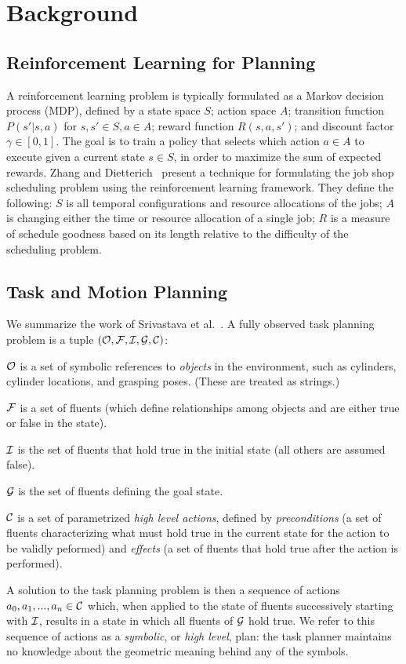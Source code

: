\section{Background}
\subsection{Reinforcement Learning for Planning}
A reinforcement learning problem is typically formulated as
a Markov decision process (MDP), defined by a state space
$S$; action space $A$; transition function $P(s' | s, a)$ for $s, s' \in S, a \in A$;
reward function $R(s, a, s')$; and discount factor $\gamma \in [0, 1]$. The goal
is to train a policy that selects which action $a \in A$ to execute given a current
state $s \in S$, in order to maximize the sum of expected rewards. Zhang
and Dietterich~\cite{JobShopSched} present a technique for formulating the job shop scheduling
problem using the reinforcement learning framework. They define the following:
$S$ is all temporal configurations and resource allocations of the jobs; $A$ is changing
either the time or resource allocation of a single job; $R$ is a measure of schedule
goodness based on its length relative to the difficulty of the scheduling problem.
\subsection{Task and Motion Planning}
We summarize the work of Srivastava et al.~\cite{srivastava2014combined}. A fully observed task planning
problem is a tuple $(\mathcal{O}, \mathcal{F}, \mathcal{I}, \mathcal{G}, \mathcal{C})$:

$\mathcal{O}$ is a set of symbolic references to \emph{objects} in the environment,
such as cylinders, cylinder locations, and grasping poses. (These are treated as strings.)

$\mathcal{F}$ is a set of fluents (which define relationships among objects and are either
true or false in the state).

$\mathcal{I}$ is the set of fluents that hold true in the initial state
(all others are assumed false).

$\mathcal{G}$ is the set of fluents defining the goal state.

$\mathcal{C}$ is a set of parametrized \emph{high level actions}, defined by \emph{preconditions} (a set
of fluents characterizing what must hold true in the current state for the action
to be validly peformed) and \emph{effects} (a set of fluents that hold true after
the action is performed).

A solution to the task planning problem is then a sequence of actions
$a_{0}, a_{1}, ..., a_{n} \in \mathcal{C}$ which, when applied to the state of fluents
successively starting with $\mathcal{I}$, results in a state in which all fluents of
$\mathcal{G}$ hold true. We refer to this sequence of actions as a \emph{symbolic}, or
\emph{high level}, plan: the task planner maintains no knowledge about the geometric meaning
behind any of the symbols.

